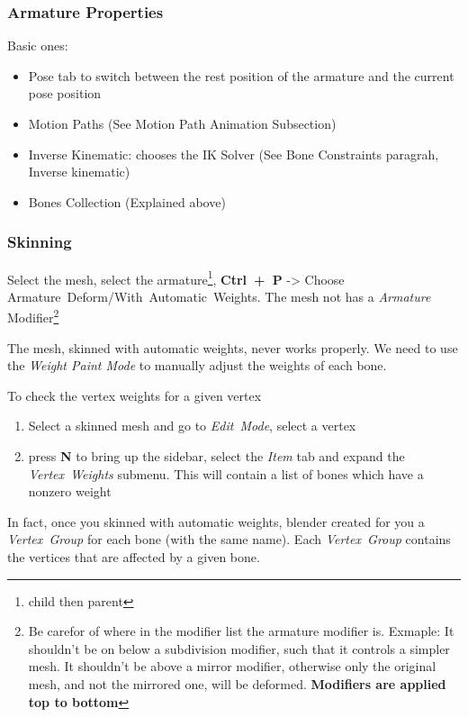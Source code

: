 \documentclass{article}
\begin{document}
\subsubsection{Armature Properties}
Basic ones:
\begin{itemize}[noitemsep, topsep=0pt]
    \item Pose tab to switch between the rest position of the armature and the current pose position
    \item Motion Paths (See Motion Path Animation Subsection)
    \item Inverse Kinematic: chooses the IK Solver (See Bone Constraints paragrah, Inverse kinematic)
    \item Bones Collection (Explained above)
\end{itemize}

\subsubsection{Skinning}\label{armature:skinning}
Select the mesh, select the armature\footnote{child then parent}, \mbox{\textbf{Ctrl + P}} -> Choose \mbox{Armature Deform/With Automatic Weights}. The mesh not has a \textit{Armature} Modifier\footnote{Be 
carefor of where in the modifier list the armature modifier is. Exmaple: It shouldn't be on below a subdivision modifier, such that it controls a simpler mesh. It shouldn't be above a mirror modifier, 
otherwise only the original mesh, and not the mirrored one, will be deformed. \textbf{Modifiers are applied top to bottom}}\par
The mesh, skinned with automatic weights, never works properly. We need to use the \textit{Weight Paint Mode} to manually adjust the weights of each bone.\par
To check the vertex weights for a given vertex
\begin{enumerate}[noitemsep, topsep=0pt]
    \item Select a skinned mesh and go to \mbox{\textit{Edit Mode}}, select a vertex
    \item press \textbf{N} to bring up the sidebar, select the \textit{Item} tab and expand the \mbox{\textit{Vertex Weights}} submenu. This will contain a list of bones which have a nonzero weight
\end{enumerate}
In fact, once you skinned with automatic weights, blender created for you a \mbox{\textit{Vertex Group}} for each bone (with the same name). Each \mbox{\textit{Vertex Group}} contains the vertices that 
are affected by a given bone.
\end{document}
